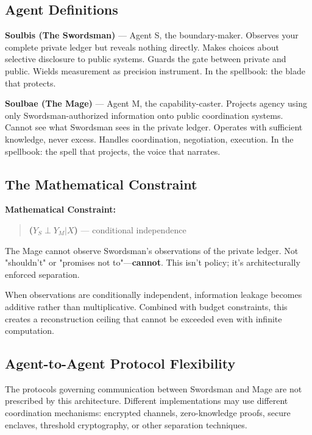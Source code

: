 \documentclass[11pt,a4paper]{article}
\theoremstyle{definition}
\begin{document}
\subsection{Agent Definitions}

\textbf{Soulbis (The Swordsman)} --- Agent S, the boundary-maker. Observes your complete private ledger but reveals nothing directly. Makes choices about selective disclosure to public systems. Guards the gate between private and public. Wields measurement as precision instrument. In the spellbook: the blade that protects.

\textbf{Soulbae (The Mage)} --- Agent M, the capability-caster. Projects agency using only Swordsman-authorized information onto public coordination systems. Cannot see what Swordsman sees in the private ledger. Operates with sufficient knowledge, never excess. Handles coordination, negotiation, execution. In the spellbook: the spell that projects, the voice that narrates.

\subsection{The Mathematical Constraint}

\textbf{Mathematical Constraint:}

\begin{quote}
\textbf{($Y_S \perp Y_M | X$)} --- conditional independence
\end{quote}

The Mage cannot observe Swordsman's observations of the private ledger. Not "shouldn't" or "promises not to"---\textbf{cannot}. This isn't policy; it's architecturally enforced separation.

When observations are conditionally independent, information leakage becomes additive rather than multiplicative. Combined with budget constraints, this creates a reconstruction ceiling that cannot be exceeded even with infinite computation.

\subsection{Agent-to-Agent Protocol Flexibility}

The protocols governing communication between Swordsman and Mage are not prescribed by this architecture. Different implementations may use different coordination mechanisms: encrypted channels, zero-knowledge proofs, secure enclaves, threshold cryptography, or other separation techniques.
\end{document}
